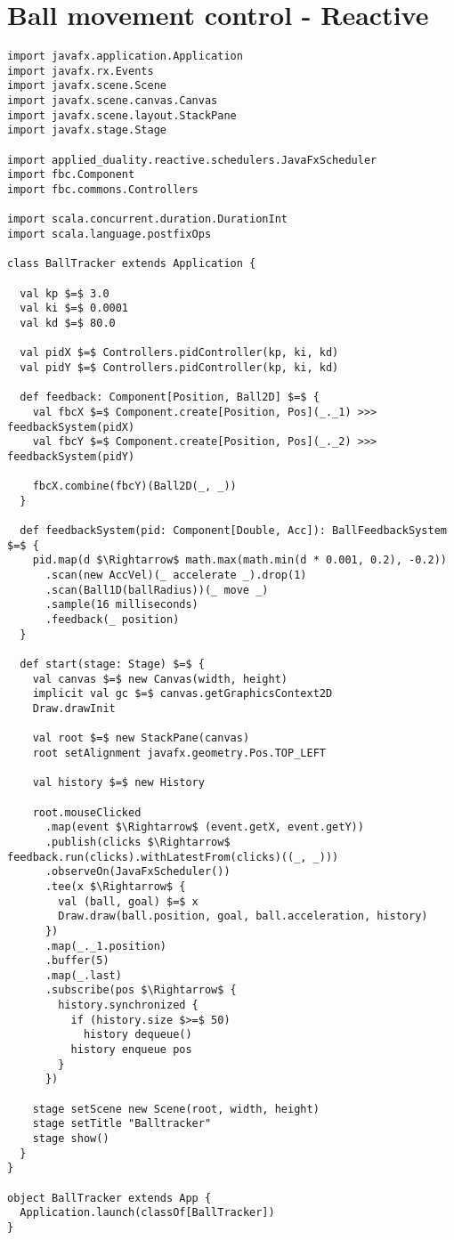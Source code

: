 \chapter{Ball movement control - Reactive}
\label{app:ball-movement-reactive}

\begin{lstlisting}[style=ScalaStyle, caption={Ball movement control}, label={lst:ball-full-app-reactive}]
import javafx.application.Application
import javafx.rx.Events
import javafx.scene.Scene
import javafx.scene.canvas.Canvas
import javafx.scene.layout.StackPane
import javafx.stage.Stage

import applied_duality.reactive.schedulers.JavaFxScheduler
import fbc.Component
import fbc.commons.Controllers

import scala.concurrent.duration.DurationInt
import scala.language.postfixOps

class BallTracker extends Application {

  val kp $=$ 3.0
  val ki $=$ 0.0001
  val kd $=$ 80.0

  val pidX $=$ Controllers.pidController(kp, ki, kd)
  val pidY $=$ Controllers.pidController(kp, ki, kd)

  def feedback: Component[Position, Ball2D] $=$ {
    val fbcX $=$ Component.create[Position, Pos](_._1) >>> feedbackSystem(pidX)
    val fbcY $=$ Component.create[Position, Pos](_._2) >>> feedbackSystem(pidY)

    fbcX.combine(fbcY)(Ball2D(_, _))
  }

  def feedbackSystem(pid: Component[Double, Acc]): BallFeedbackSystem $=$ {
    pid.map(d $\Rightarrow$ math.max(math.min(d * 0.001, 0.2), -0.2))
      .scan(new AccVel)(_ accelerate _).drop(1)
      .scan(Ball1D(ballRadius))(_ move _)
      .sample(16 milliseconds)
      .feedback(_ position)
  }

  def start(stage: Stage) $=$ {
    val canvas $=$ new Canvas(width, height)
    implicit val gc $=$ canvas.getGraphicsContext2D
    Draw.drawInit

    val root $=$ new StackPane(canvas)
    root setAlignment javafx.geometry.Pos.TOP_LEFT

    val history $=$ new History

    root.mouseClicked
      .map(event $\Rightarrow$ (event.getX, event.getY))
      .publish(clicks $\Rightarrow$ feedback.run(clicks).withLatestFrom(clicks)((_, _)))
      .observeOn(JavaFxScheduler())
      .tee(x $\Rightarrow$ {
        val (ball, goal) $=$ x
        Draw.draw(ball.position, goal, ball.acceleration, history)
      })
      .map(_._1.position)
      .buffer(5)
      .map(_.last)
      .subscribe(pos $\Rightarrow$ {
        history.synchronized {
          if (history.size $>=$ 50)
            history dequeue()
          history enqueue pos
        }
      })

    stage setScene new Scene(root, width, height)
    stage setTitle "Balltracker"
    stage show()
  }
}

object BallTracker extends App {
  Application.launch(classOf[BallTracker])
}
\end{lstlisting}

